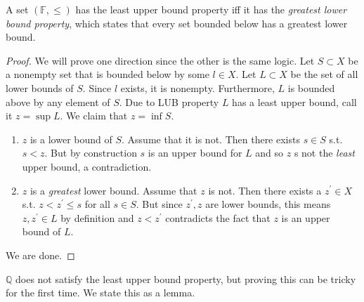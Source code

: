   \begin{theorem}
    A set $(\mathbb{F}, \leq)$ has the least upper bound property iff it has the \textit{greatest lower bound property}, which states that every set bounded below has a greatest lower bound. 
  \end{theorem}
  \begin{proof}
    We will prove one direction since the other is the same logic. Let $S \subset X$ be a nonempty set that is bounded below by some $l \in X$. Let $L \subset X$ be the set of all lower bounds of $S$. Since $l$ exists, it is nonempty. Furthermore, $L$ is bounded above by any element of $S$. Due to LUB property $L$ has a least upper bound, call it $z = \sup{L}$. We claim that $z = \inf{S}$. 
    \begin{enumerate}
      \item $z$ is a lower bound of $S$. Assume that it is not. Then there exists $s \in S$ s.t. $s < z$. But by construction $s$ is an upper bound for $L$ and so $z$ s not the \textit{least} upper bound, a contradiction. 
      \item $z$ is a \textit{greatest} lower bound. Assume that $z$ is not. Then there exists a $z^\prime \in X$ s.t. $z < z^\prime \leq s$ for all $s \in S$. But since $z^\prime, z$ are lower bounds, this means $z, z^\prime \in L$ by definition and $z < z^\prime$ contradicts the fact that $z$ is an upper bound of $L$. 
    \end{enumerate}
    We are done. 
  \end{proof}

  $\mathbb{Q}$ does not satisfy the least upper bound property, but proving this can be tricky for the first time. We state this as a lemma. 

